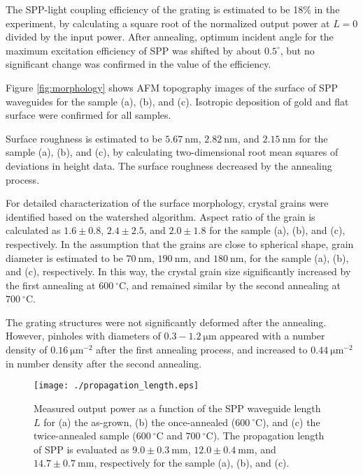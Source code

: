 \documentclass[twocolumn,10.5pt,a4]{article}
\begin{document}
The SPP-light coupling efficiency of the grating is estimated to be 18\% in the experiment, by calculating a square root of the normalized output power at $L=0$ divided by the input power.
After annealing, optimum incident angle for the maximum excitation efficiency of SPP was shifted by about $0.5^\circ$, but no significant change was confirmed in the value of the efficiency.

Figure \ref{fig:morphology} shows AFM topography images of the surface of SPP waveguides for the sample (a), (b), and (c).
Isotropic deposition of gold and flat surface were confirmed for all samples. 

Surface roughness is estimated to be $5.67\:\mathrm{nm}$, $2.82\:\mathrm{nm}$, and $2.15\:\mathrm{nm}$ for the sample (a), (b), and (c), by calculating two-dimensional root mean squares of deviations in height data. 
The surface roughness decreased by the annealing process.

For detailed characterization of the surface morphology, crystal grains were identified based on the watershed algorithm. Aspect ratio of the grain is calculated as $1.6\pm0.8$, $2.4\pm2.5$, and $2.0\pm1.8$ for the sample (a), (b), and (c), respectively. In the assumption that the grains are close to spherical shape, grain diameter is estimated to be $70\:\mathrm{nm}$, $190\:\mathrm{nm}$, and $180\:\mathrm{nm}$, for the sample (a), (b), and (c), respectively.
In this way, the crystal grain size significantly increased by the first annealing at $600\:^\circ\mathrm{C}$, and remained similar by the second annealing at $700\:^\circ\mathrm{C}$.

The grating structures were not significantly deformed after the annealing. However, pinholes with diameters of $0.3-1.2\:\mathrm{\mu m}$ appeared with a number density of $0.16\:\mathrm{\mu m^{-2}}$ after the first annealing process, and increased to $0.44\:\mathrm{\mu m^{-2}}$ in number density after the second annealing.

 \begin{figure}[!htbp]
   \begin{center}
    \texttt{[image: ./propagation\_length.eps]}
    \caption{Measured output power as a function of the SPP waveguide length $L$ for (a) the as-grown, (b) the once-annealed ($600\:^\circ\mathrm{C}$), and (c) the twice-annealed sample ($600\:^\circ\mathrm{C}$ and $700\:^\circ\mathrm{C}$). The propagation length of SPP is evaluated as $9.0\pm0.3\:\mathrm{mm}$, $12.0\pm0.4\:\mathrm{mm}$, and $14.7\pm0.7\:\mathrm{mm}$, respectively for the sample (a), (b), and (c).}
       \label{fig:propagation_length}
   \end{center}
\end{figure}
\end{document}
